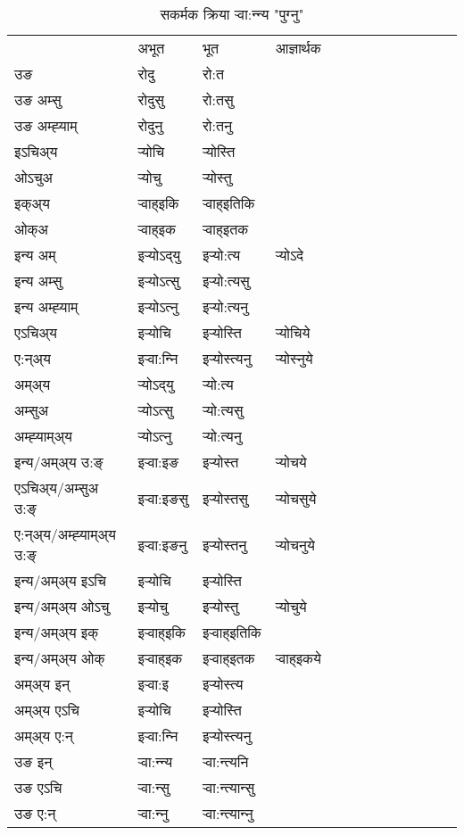 \begin{table}[H]
\label{ot.vt} \centering
\caption{सकर्मक क्रिया  र्‍वा:न्‍न्य  "पुग्नु"  }
\begin{tabular}{l|l|l|l|l|l|l|l|l|l|l|l|l}  \toprule
&अभूत & भूत & आज्ञार्थक \\ 
उङ &रोदु &रो:त \\ 
उङ अम्सु &रोदुसु &रो:तसु \\ 
उङ अम्ह्‍याम् &रोदुनु &रो:तनु \\ 
इऽचिअ्य &र्‍योचि &र्‍योस्ति   \\ 
ओऽचुअ &र्‍योचु &र्‍योस्तु   \\ 
इक्अ्य &र्‍वाह्इकि &र्‍वाह्इतिकि   \\ 
ओक्अ &र्‍वाह्इक &र्‍वाह्इतक   \\ 
इन्य अम् & इर्‍योऽद्‌यु  & इर्‍यो:त्य &र्‍योऽदे  \\ 
इन्य अम्सु & इर्‍योऽत्सु  & इर्‍यो:त्यसु   \\ 
इन्य अम्ह्‍याम् & इर्‍योऽत्‍नु  & इर्‍यो:त्यनु   \\ 
एऽचिअ्य & इर्‍योचि & इर्‍योस्ति &र्‍योचिये    \\ 
ए:न्अ्य & इर्‍वा:न्‍नि  & इर्‍योस्त्यनु &र्‍योस्‍नुये  \\ 
अम्अ्य & र्‍योऽद्‌यु  & र्‍यो:त्य  \\ 
अम्सुअ & र्‍योऽत्सु & र्‍यो:त्यसु  \\ 
अम्ह्‍याम्अ्य & र्‍योऽत्‍नु  & र्‍यो:त्यनु \\ 
\midrule
इन्य/अम्अ्य उ:ङ्‌&इर्‍वा:इङ & इर्‍योस्त &र्‍योचये \\ 
एऽचिअ्य/अम्सुअ उ:ङ्‌ &इर्‍वा:इङसु & इर्‍योस्तसु &र्‍योचसुये \\ 
ए:न्अ्य/अम्ह्‍याम्अ्य उ:ङ्‌ &इर्‍वा:इङनु & इर्‍योस्तनु &र्‍योचनुये \\ 
इन्य/अम्अ्य इऽचि & इर्‍योचि & इर्‍योस्ति    \\ 
इन्य/अम्अ्य ओऽचु & इर्‍योचु & इर्‍योस्तु  &र्‍योचुये  \\ 
इन्य/अम्अ्य इक् & इर्‍वाह्इकि & इर्‍वाह्इतिकि   \\ 
इन्य/अम्अ्य ओक् & इर्‍वाह्इक & इर्‍वाह्इतक  &र्‍वाह्इकये  \\ 
अम्अ्य इन् & इर्‍वा:इ & इर्‍योस्त्य   \\ 
अम्अ्य एऽचि & इर्‍योचि & इर्‍योस्ति    \\ 
अम्अ्य ए:न् & इर्‍वा:न्‍नि  & इर्‍योस्त्यनु  \\ 
\midrule
उङ इन् & र्‍वा:न्‍न्य  & र्‍वा:न्त्यनि  \\ 
उङ एऽचि & र्‍वा:न्सु  & र्‍वा:न्त्यान्सु   \\ 
उङ ए:न्& र्‍वा:न्‍नु  & र्‍वा:न्त्यान्‍नु   \\ 
\bottomrule
\end{tabular}
\end{table}



